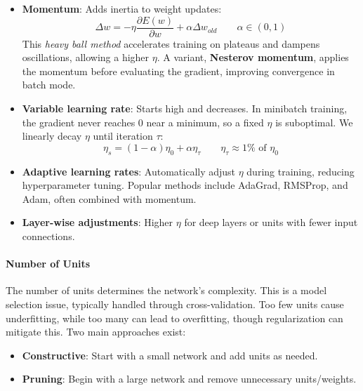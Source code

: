\begin{itemize}
    \item \textbf{Momentum}: Adds inertia to weight updates:
    \begin{equation*}
        \Delta w = - \eta \dfrac{\partial E(w)}{\partial w} + \alpha \Delta w_{old} \qquad \alpha\in (0,1)
    \end{equation*}
    This \textit{heavy ball method} accelerates training on plateaus and dampens oscillations, allowing a higher $\eta$. A variant, \textbf{Nesterov momentum}, applies the momentum before evaluating the gradient, improving convergence in batch mode.

    \item \textbf{Variable learning rate}: Starts high and decreases. In minibatch training, the gradient never reaches 0 near a minimum, so a fixed $\eta$ is suboptimal. We linearly decay $\eta$ until iteration $\tau$:
    \begin{equation*}
        \eta_s = (1-\alpha)\eta_0 + \alpha \eta_{\tau} \qquad \eta_{\tau} \approx 1\% \text{ of } \eta_0
    \end{equation*}

    \item \textbf{Adaptive learning rates}: Automatically adjust $\eta$ during training, reducing hyperparameter tuning. Popular methods include AdaGrad, RMSProp, and Adam, often combined with momentum.

    \item \textbf{Layer-wise adjustments}: Higher $\eta$ for deep layers or units with fewer input connections.
\end{itemize}

\paragraph{Number of Units}

The number of units determines the network's complexity. This is a model selection issue, typically handled through cross-validation. Too few units cause underfitting, while too many can lead to overfitting, though regularization can mitigate this. Two main approaches exist:

\begin{itemize}
    \item \textbf{Constructive}: Start with a small network and add units as needed.
    \item \textbf{Pruning}: Begin with a large network and remove unnecessary units/weights.
\end{itemize}

